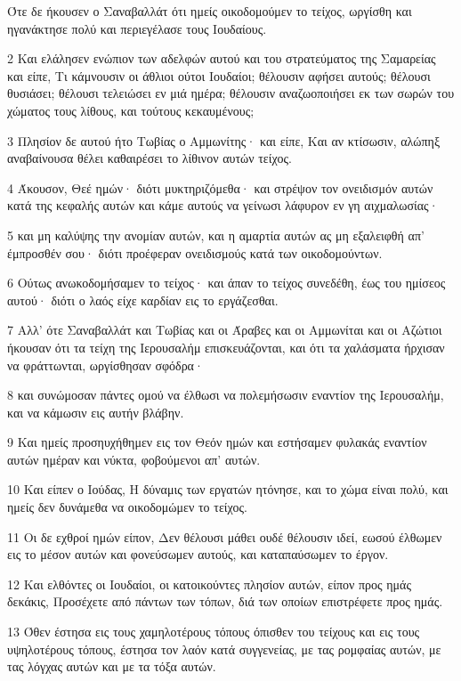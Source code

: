 \par Ότε δε ήκουσεν ο Σαναβαλλάτ ότι ημείς οικοδομούμεν το τείχος, ωργίσθη και ηγανάκτησε πολύ και περιεγέλασε τους Ιουδαίους.
\par 2 Και ελάλησεν ενώπιον των αδελφών αυτού και του στρατεύματος της Σαμαρείας και είπε, Τι κάμνουσιν οι άθλιοι ούτοι Ιουδαίοι; θέλουσιν αφήσει αυτούς; θέλουσι θυσιάσει; θέλουσι τελειώσει εν μιά ημέρα; θέλουσιν αναζωοποιήσει εκ των σωρών του χώματος τους λίθους, και τούτους κεκαυμένους;
\par 3 Πλησίον δε αυτού ήτο Τωβίας ο Αμμωνίτης· και είπε, Και αν κτίσωσιν, αλώπηξ αναβαίνουσα θέλει καθαιρέσει το λίθινον αυτών τείχος.
\par 4 Άκουσον, Θεέ ημών· διότι μυκτηριζόμεθα· και στρέψον τον ονειδισμόν αυτών κατά της κεφαλής αυτών και κάμε αυτούς να γείνωσι λάφυρον εν γη αιχμαλωσίας·
\par 5 και μη καλύψης την ανομίαν αυτών, και η αμαρτία αυτών ας μη εξαλειφθή απ' έμπροσθέν σου· διότι προέφεραν ονειδισμούς κατά των οικοδομούντων.
\par 6 Ούτως ανωκοδομήσαμεν το τείχος· και άπαν το τείχος συνεδέθη, έως του ημίσεος αυτού· διότι ο λαός είχε καρδίαν εις το εργάζεσθαι.
\par 7 Αλλ' ότε Σαναβαλλάτ και Τωβίας και οι Άραβες και οι Αμμωνίται και οι Αζώτιοι ήκουσαν ότι τα τείχη της Ιερουσαλήμ επισκευάζονται, και ότι τα χαλάσματα ήρχισαν να φράττωνται, ωργίσθησαν σφόδρα·
\par 8 και συνώμοσαν πάντες ομού να έλθωσι να πολεμήσωσιν εναντίον της Ιερουσαλήμ, και να κάμωσιν εις αυτήν βλάβην.
\par 9 Και ημείς προσηυχήθημεν εις τον Θεόν ημών και εστήσαμεν φυλακάς εναντίον αυτών ημέραν και νύκτα, φοβούμενοι απ' αυτών.
\par 10 Και είπεν ο Ιούδας, Η δύναμις των εργατών ητόνησε, και το χώμα είναι πολύ, και ημείς δεν δυνάμεθα να οικοδομώμεν το τείχος.
\par 11 Οι δε εχθροί ημών είπον, Δεν θέλουσι μάθει ουδέ θέλουσιν ιδεί, εωσού έλθωμεν εις το μέσον αυτών και φονεύσωμεν αυτούς, και καταπαύσωμεν το έργον.
\par 12 Και ελθόντες οι Ιουδαίοι, οι κατοικούντες πλησίον αυτών, είπον προς ημάς δεκάκις, Προσέχετε από πάντων των τόπων, διά των οποίων επιστρέφετε προς ημάς.
\par 13 Όθεν έστησα εις τους χαμηλοτέρους τόπους όπισθεν του τείχους και εις τους υψηλοτέρους τόπους, έστησα τον λαόν κατά συγγενείας, με τας ρομφαίας αυτών, με τας λόγχας αυτών και με τα τόξα αυτών.
